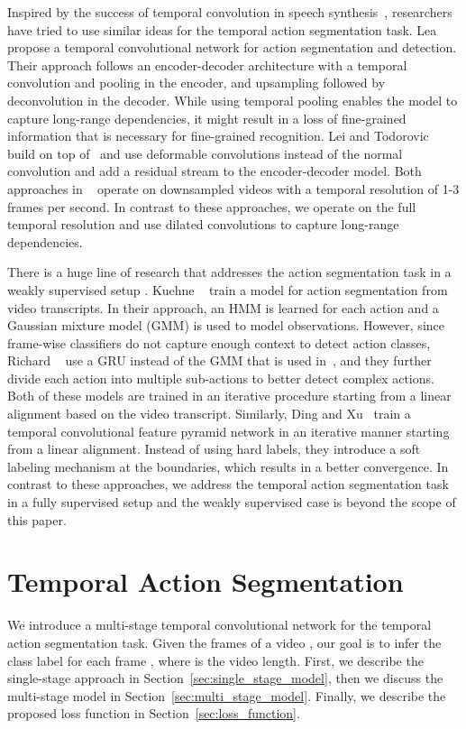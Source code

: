 \documentclass[10pt,twocolumn,letterpaper]{article}
\begin{document}
Inspired by the success of temporal convolution in speech synthesis~\cite{van2016wavenet}, 
researchers have tried to use similar ideas for the temporal action segmentation 
task. Lea \etal~\cite{Lea_2017_CVPR} propose a temporal convolutional network for action 
segmentation and detection. Their approach follows an encoder-decoder architecture with 
a temporal convolution and pooling in the encoder, and upsampling followed by deconvolution 
in the decoder. While using temporal pooling enables the model to capture long-range dependencies, 
it might result in a loss of fine-grained information that is necessary for fine-grained recognition. 
Lei and Todorovic~\cite{lei2018temporal} build on top of~\cite{Lea_2017_CVPR} and use deformable 
convolutions instead of the normal convolution and add a residual stream to the encoder-decoder model. 
Both approaches in ~\cite{Lea_2017_CVPR, lei2018temporal} operate on downsampled videos with 
a temporal resolution of 1-3 frames per second.
In contrast to these approaches, we operate on the full temporal resolution and 
use dilated convolutions to capture long-range dependencies.

There is a huge line of research that addresses the action segmentation task in 
a weakly supervised setup \cite{bojanowski2014weakly, huang2016connectionist, kuehne2017weakly, 
richard2017weakly, ding2018weakly}. 
Kuehne \etal~\cite{kuehne2017weakly} train a model for action segmentation from 
video transcripts. In their approach, an HMM is learned for each action and a Gaussian 
mixture model (GMM) is used to model observations. However, since frame-wise classifiers 
do not capture enough context to detect action classes, Richard \etal~\cite{richard2017weakly} 
use a GRU instead of the GMM that is used in~\cite{kuehne2017weakly}, and they further 
divide each action into multiple sub-actions to better detect complex actions. 
Both of these models are trained in an iterative procedure starting from a linear alignment 
based on the video transcript. Similarly, Ding and Xu~\cite{ding2018weakly} train a temporal 
convolutional feature pyramid network in an iterative manner starting from a linear alignment. 
Instead of using hard labels, they introduce a soft labeling mechanism at the 
boundaries, which results in a better convergence. In contrast to these approaches, we address 
the temporal action segmentation task in a fully supervised setup and the weakly 
supervised case is beyond the scope of this paper.

\section{Temporal Action Segmentation}
We introduce a multi-stage temporal convolutional network for the temporal
action segmentation task. Given the frames of a video 
, our goal is to infer the class label for 
each frame , where  is the video length.  
First, we describe the single-stage approach in 
Section~\ref{sec:single_stage_model}, then we discuss the multi-stage 
model in Section~\ref{sec:multi_stage_model}. Finally, we describe the 
proposed loss function in Section~\ref{sec:loss_function}.
 
\end{document}
